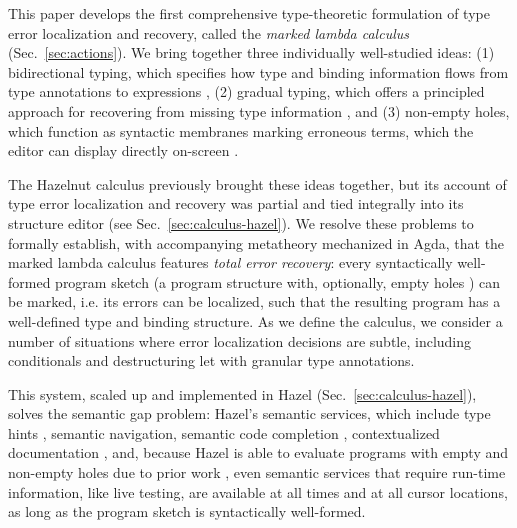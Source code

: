 This paper develops the first comprehensive {type-theoretic formulation} of type error localization and recovery, called the \emph{marked lambda calculus} (Sec.~\ref{sec:actions}).
We bring together three individually well-studied ideas: (1) bidirectional typing, which specifies how type and binding information flows from 
type annotations to expressions \cite{pierce,BidirTyping}, (2) gradual typing, which offers a principled approach for recovering from missing type information  \cite{GradualTyping,sieksnapl}, and 
(3) non-empty holes, which function as syntactic membranes marking erroneous terms, which the editor can display directly on-screen \cite{HazelnutPOPL}.

The Hazelnut calculus \cite{HazelnutPOPL} previously brought these ideas together, but its account of type error localization and recovery was partial and tied integrally into its structure editor (see Sec.~\ref{sec:calculus-hazel}). 
We resolve these problems to formally establish, with accompanying metatheory mechanized in Agda, that the marked lambda calculus features \emph{total error recovery}: {every} syntactically well-formed program sketch (a program structure with, optionally, empty holes \cite{sketching}) can be marked, i.e. its errors can be localized, such that the resulting program has a well-defined type and binding structure.
As we define the calculus, we consider a number of situations where error localization decisions are subtle, including conditionals and destructuring let with granular type annotations.

This system, scaled up and implemented in Hazel (Sec.~\ref{sec:calculus-hazel}), solves the semantic gap problem: Hazel's semantic services, which include type hints \cite{potter1}, semantic navigation, semantic code completion \cite{potter1,blinn}, contextualized documentation \cite{potter2}, and, because Hazel is able to evaluate programs with empty and non-empty holes due to prior work \cite{HazelnutLive}, even semantic services that require run-time information, like live testing, 
are available at all times and at all cursor locations, as long as the program sketch is syntactically well-formed.


